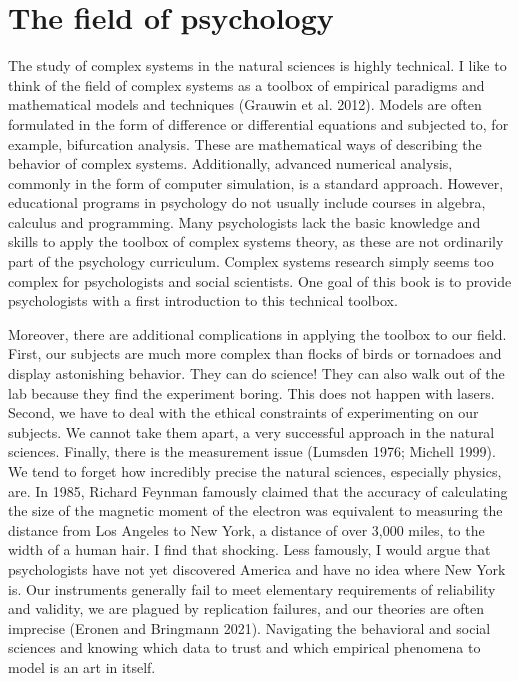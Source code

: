 \documentclass[
  a4paper,
  DIV=11,
  numbers=noendperiod]{scrreprt}
\begin{document}
\hypertarget{sec-The-field-of-psychology}{%
\section{The field of psychology}\label{sec-The-field-of-psychology}}

The study of complex systems in the natural sciences is highly
technical. I like to think of the field of complex systems as a toolbox
of empirical paradigms and mathematical models and techniques (Grauwin
et al. 2012). Models are often formulated in the form of difference or
differential equations and subjected to, for example, bifurcation
analysis. These are mathematical ways of describing the behavior of
complex systems. Additionally, advanced numerical analysis, commonly in
the form of computer simulation, is a standard approach. However,
educational programs in psychology do not usually include courses in
algebra, calculus and programming. Many psychologists lack the basic
knowledge and skills to apply the toolbox of complex systems theory, as
these are not ordinarily part of the psychology curriculum. Complex
systems research simply seems too complex for psychologists and social
scientists. One goal of this book is to provide psychologists with a
first introduction to this technical toolbox.

Moreover, there are additional complications in applying the toolbox to
our field. First, our subjects are much more complex than flocks of
birds or tornadoes and display astonishing behavior. They can do
science! They can also walk out of the lab because they find the
experiment boring. This does not happen with lasers. Second, we have to
deal with the ethical constraints of experimenting on our subjects. We
cannot take them apart, a very successful approach in the natural
sciences. Finally, there is the measurement issue (Lumsden 1976; Michell
1999). We tend to forget how incredibly precise the natural sciences,
especially physics, are. In 1985, Richard Feynman famously claimed that
the accuracy of calculating the size of the magnetic moment of the
electron was equivalent to measuring the distance from Los Angeles to
New York, a distance of over 3,000 miles, to the width of a human hair.
I find that shocking. Less famously, I would argue that psychologists
have not yet discovered America and have no idea where New York is. Our
instruments generally fail to meet elementary requirements of
reliability and validity, we are plagued by replication failures, and
our theories are often imprecise (Eronen and Bringmann 2021). Navigating
the behavioral and social sciences and knowing which data to trust and
which empirical phenomena to model is an art in itself.
\end{document}
